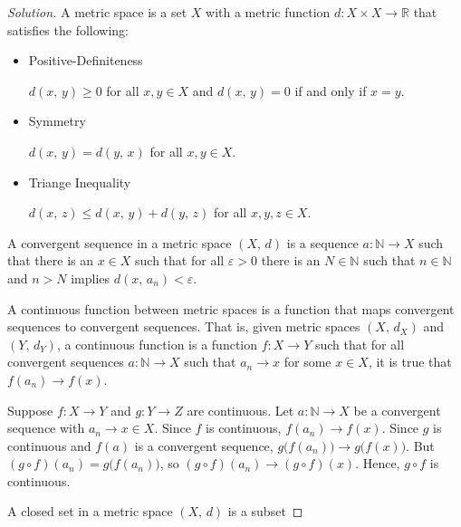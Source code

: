 \documentclass{article}
\theoremstyle{normal}
\begin{document}
    \begin{proof}[Solution]
        A metric space is a set $X$ with a metric function
        $d:X\times{X}\rightarrow\mathbb{R}$ that satisfies the following:
        \begin{itemize}
            \item
                Positive-Definiteness
                \par
                $d(x,\,y)\geq{0}$ for all $x,y\in{X}$ and
                $d(x,\,y)=0$ if and only if $x=y$.
            \item
                Symmetry
                \par
                $d(x,\,y)=d(y,\,x)$ for all $x,y\in{X}$.
            \item
                Triange Inequality
                \par
                $d(x,\,z)\leq{d}(x,\,y)+d(y,\,z)$ for all $x,y,z\in{X}$.
        \end{itemize}
        A convergent sequence in a metric space $(X,\,d)$ is a sequence
        $a:\mathbb{N}\rightarrow{X}$ such that there is an $x\in{X}$ such that
        for all $\varepsilon>0$ there is an $N\in\mathbb{N}$ such that
        $n\in\mathbb{N}$ and $n>N$ implies $d(x,\,a_{n})<\varepsilon$.
        \par\hfill\par
        A continuous function between metric spaces is a function that maps
        convergent sequences to convergent sequences. That is, given metric
        spaces $(X,\,d_{X})$ and $(Y,\,d_{Y})$, a continuous function is a
        function $f:X\rightarrow{Y}$ such that for all convergent sequences
        $a:\mathbb{N}\rightarrow{X}$ such that $a_{n}\rightarrow{x}$ for some
        $x\in{X}$, it is true that $f(a_{n})\rightarrow{f}(x)$.
        \par\hfill\par
        Suppose $f:X\rightarrow{Y}$ and $g:Y\rightarrow{Z}$ are continuous.
        Let $a:\mathbb{N}\rightarrow{X}$ be a convergent sequence with
        $a_{n}\rightarrow{x}\in{X}$. Since $f$ is continuous,
        $f(a_{n})\rightarrow{f}(x)$. Since $g$ is continuous and $f(a)$ is a
        convergent sequence, $g\big(f(a_{n})\big)\rightarrow{g}\big(f(x)\big)$.
        But $(g\circ{f})(a_{n})=g\big(f(a_{n})\big)$, so
        $(g\circ{f})(a_{n})\rightarrow(g\circ{f})(x)$. Hence, $g\circ{f}$ is
        continuous.
        \par\hfill\par
        A closed set in a metric space $(X,\,d)$ is a subset

\end{proof}
\end{document}
